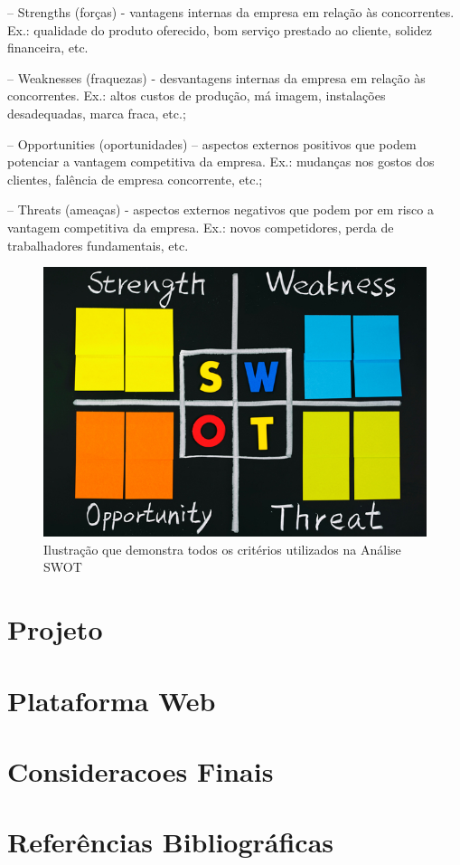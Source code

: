 \documentclass[graduacao,brazil]{ThesisPUC}
\begin{document}
-- Strengths (forças) - vantagens internas da empresa em relação às concorrentes. Ex.:
qualidade do produto oferecido, bom serviço prestado ao cliente, solidez financeira, etc.

-- Weaknesses (fraquezas) - desvantagens internas da empresa em relação às concorrentes.
Ex.: altos custos de produção, má imagem, instalações desadequadas, marca fraca, etc.;

-- Opportunities (oportunidades) – aspectos externos positivos que podem potenciar a
vantagem competitiva da empresa. Ex.: mudanças nos gostos dos clientes, falência de
empresa concorrente, etc.;

-- Threats (ameaças) - aspectos externos negativos que podem por em risco a vantagem
competitiva da empresa. Ex.: novos competidores, perda de trabalhadores fundamentais,
etc.

\begin{figure}[h]
    \includegraphics*[width=\linewidth]{Imagens/swot.jpg}
    \caption{Ilustração que demonstra todos os critérios utilizados na Análise SWOT}
\end{figure}

\chapter{Projeto}

\chapter{Plataforma Web}

\chapter{Consideracoes Finais}

\chapter{Refer\^{e}ncias Bibliogr\'{a}ficas}

\arial


\normalfont
\end{document}
